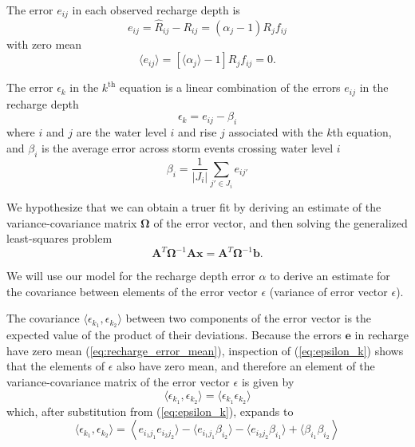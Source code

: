 \documentclass[11pt,a4paper]{article}
\renewcommand{\vec}[1]{\mathbf{#1}}
\begin{document}
The error $e_{ij}$ in each observed recharge depth is
\begin{equation}
  \label{eq:recharge_error_mean}
  e_{ij} = \widehat{R}_{ij} - R_{ij} = (\alpha_j - 1) R_j f_{ij}
\end{equation}
with zero mean
\begin{equation}
  \langle e_{ij} \rangle = \left[\langle \alpha_j\rangle - 1\right] R_j f_{ij} = 0.
\end{equation}

The error $\epsilon_k$ in the $k^\text{th}$ equation is a linear
combination of the errors $e_{ij}$ in the recharge depth
\begin{equation}
  \label{eq:epsilon_k}
  \epsilon_k = e_{ij} - \beta_i
\end{equation}
where $i$ and $j$ are the water level $i$ and rise $j$ associated with
the $k$th equation, and $\beta_i$ is the average error across storm
events crossing water level $i$
\begin{equation}
  \label{eq:beta_i}
  \beta_i = \frac{1}{|J_i|}\sum_{j' \in J_i} e_{ij'}
\end{equation}

We hypothesize that we can obtain a truer fit by deriving an estimate
of the variance-covariance matrix $\bm{\Omega}$ of the error vector,
and then solving the generalized least-squares problem
\begin{equation}
  \label{eq:generalized_lsq}
  \vec{A}^T \bm{\Omega}^{-1} \vec{A} \vec{x} = \vec{A}^T \bm{\Omega}^{-1} \vec{b}.
\end{equation}

We will use our model for the recharge depth error $\alpha$ to derive
an estimate for the covariance between elements of the error vector
$\epsilon$ (variance of error vector $\epsilon$).

The covariance $\langle \epsilon_{k_1}, \epsilon_{k_2} \rangle$
between two components of the error vector is the expected value of
the product of their deviations.  Because the errors $\vec{e}$ in
recharge have zero mean (\ref{eq:recharge_error_mean}), inspection of
(\ref{eq:epsilon_k}) shows that the elements of $\mathbb{\epsilon}$
also have zero mean, and therefore an element of the
variance-covariance matrix of the error vector $\mathbb\epsilon$ is
given by
\begin{equation}
  \label{eq:epsilon_covariance}
  \langle \epsilon_{k_1}, \epsilon_{k_2} \rangle = \langle \epsilon_{k_1} \epsilon_{k_2}\rangle
\end{equation}
which, after substitution from (\ref{eq:epsilon_k}), expands to
\begin{equation}
  \label{eq:epsilon_covariance_terms}
  \langle \epsilon_{k_1}, \epsilon_{k_2} \rangle = \left\langle e_{i_1 j_1} e_{i_2 j_2}\rangle - \langle e_{i_1 j_1}\beta_{i_2}\rangle - \langle e_{i_2 j_2}\beta_{i_1}\rangle + \langle \beta_{i_1}\beta_{i_2} \right\rangle
\end{equation}
\end{document}
